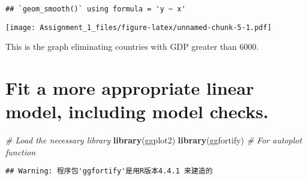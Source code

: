 \documentclass[
]{article}
\newenvironment{Shaded}{\begin{snugshade}}{\end{snugshade}}
\newcommand{\AttributeTok}[1]{\textcolor[rgb]{0.13,0.29,0.53}{#1}}
\newcommand{\CommentTok}[1]{\textcolor[rgb]{0.56,0.35,0.01}{\textit{#1}}}
\newcommand{\ConstantTok}[1]{\textcolor[rgb]{0.56,0.35,0.01}{#1}}
\newcommand{\DecValTok}[1]{\textcolor[rgb]{0.00,0.00,0.81}{#1}}
\newcommand{\FunctionTok}[1]{\textcolor[rgb]{0.13,0.29,0.53}{\textbf{#1}}}
\newcommand{\NormalTok}[1]{#1}
\newcommand{\OtherTok}[1]{\textcolor[rgb]{0.56,0.35,0.01}{#1}}
\newcommand{\SpecialCharTok}[1]{\textcolor[rgb]{0.81,0.36,0.00}{\textbf{#1}}}
\newcommand{\StringTok}[1]{\textcolor[rgb]{0.31,0.60,0.02}{#1}}
\begin{document}
\begin{verbatim}
## `geom_smooth()` using formula = 'y ~ x'
\end{verbatim}

\texttt{[image: Assignment\_1\_files/figure-latex/unnamed-chunk-5-1.pdf]}

This is the graph eliminating countries with GDP greater than 6000.

\section{Fit a more appropriate linear model, including model
checks.}\label{fit-a-more-appropriate-linear-model-including-model-checks.}

\begin{Shaded}
\begin{Highlighting}[]
\CommentTok{\# Load the necessary library}
\FunctionTok{library}\NormalTok{(ggplot2)}
\FunctionTok{library}\NormalTok{(ggfortify) }\CommentTok{\# For autoplot function}
\end{Highlighting}
\end{Shaded}

\begin{verbatim}
## Warning: 程序包'ggfortify'是用R版本4.4.1 来建造的
\end{verbatim}

\begin{Shaded}
\end{Shaded}
\end{document}
